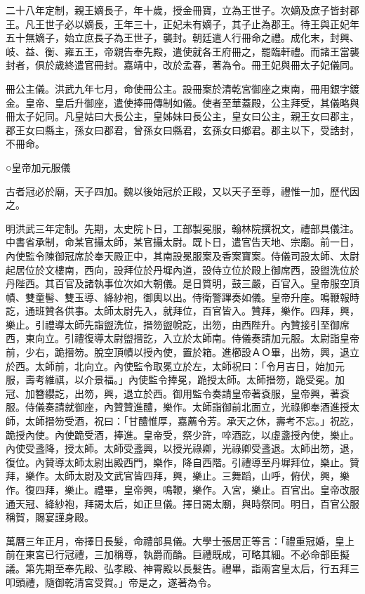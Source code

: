 二十八年定制，親王嫡長子，年十歲，授金冊寶，立為王世子。次嫡及庶子皆封郡王。凡王世子必以嫡長，王年三十，正妃未有嫡子，其子止為郡王。待王與正妃年五十無嫡子，始立庶長子為王世子，襲封。朝廷遣人行冊命之禮。成化末，封興、岐、益、衡、雍五王，帝親告奉先殿，遣使就各王府冊之，罷臨軒禮。而諸王當襲封者，俱於歲終遣官冊封。嘉靖中，改於孟春，著為令。冊王妃與冊太子妃儀同。

冊公主儀。洪武九年七月，命使冊公主。設冊案於清乾宮御座之東南，冊用銀字鍍金。皇帝、皇后升御座，遣使捧冊傳制如儀。使者至華蓋殿，公主拜受，其儀略與冊太子妃同。凡皇姑曰大長公主，皇姊妹曰長公主，皇女曰公主，親王女曰郡主，郡王女曰縣主，孫女曰郡君，曾孫女曰縣君，玄孫女曰鄉君。郡主以下，受誥封，不冊命。

○皇帝加元服儀

古者冠必於廟，天子四加。魏以後始冠於正殿，又以天子至尊，禮惟一加，歷代因之。

明洪武三年定制。先期，太史院卜日，工部製冕服，翰林院撰祝文，禮部具儀注。中書省承制，命某官攝太師，某官攝太尉。既卜日，遣官告天地、宗廟。前一日，內使監令陳御冠席於奉天殿正中，其南設冕服案及香案寶案。侍儀司設太師、太尉起居位於文樓南，西向，設拜位於丹墀內道，設侍立位於殿上御席西，設盥洗位於丹陛西。其百官及諸執事位次如大朝儀。是日質明，鼓三嚴，百官入。皇帝服空頂幘、雙童髻、雙玉導、絳紗袍，御輿以出。侍衛警蹕奏如儀。皇帝升座。鳴鞭報時訖，通班贊各供事。太師太尉先入，就拜位，百官皆入。贊拜，樂作。四拜，興，樂止。引禮導太師先詣盥洗位，搢笏盥帨訖，出笏，由西陛升。內贊接引至御席西，東向立。引禮復導太尉盥搢訖，入立於太師南。侍儀奏請加元服。太尉詣皇帝前，少右，跪搢笏。脫空頂幘以授內使，置於箱。進櫛設ＡＯ畢，出笏，興，退立於西。太師前，北向立。內使監令取冕立於左，太師祝曰：「令月吉日，始加元服，壽考維祺，以介景福。」內使監令捧冕，跪授太師。太師搢笏，跪受冕。加冠、加簪纓訖，出笏，興，退立於西。御用監令奏請皇帝著袞服，皇帝興，著袞服。侍儀奏請就御座，內贊贊進醴，樂作。太師詣御前北面立，光祿卿奉酒進授太師，太師搢笏受酒，祝曰：「甘醴惟厚，嘉薦令芳。承天之休，壽考不忘。」祝訖，跪授內使。內使跪受酒，捧進。皇帝受，祭少許，啐酒訖，以虛盞授內使，樂止。內使受盞降，授太師。太師受盞興，以授光祿卿，光祿卿受盞退。太師出笏，退，復位。內贊導太師太尉出殿西門，樂作，降自西階。引禮導至丹墀拜位，樂止。贊拜，樂作。太師太尉及文武官皆四拜，興，樂止。三舞蹈，山呼，俯伏，興，樂作。復四拜，樂止。禮畢，皇帝興，鳴鞭，樂作。入宮，樂止。百官出。皇帝改服通天冠、絳紗袍，拜謁太后，如正旦儀。擇日謁太廟，與時祭同。明日，百官公服稱賀，賜宴謹身殿。

萬曆三年正月，帝擇日長髮，命禮部具儀。大學士張居正等言：「禮重冠婚，皇上前在東宮已行冠禮，三加稱尊，執爵而酳。巨禮既成，可略其細。不必命部臣擬議。第先期至奉先殿、弘孝殿、神霄殿以長髮告。禮畢，詣兩宮皇太后，行五拜三叩頭禮，隨御乾清宮受賀。」帝是之，遂著為令。

